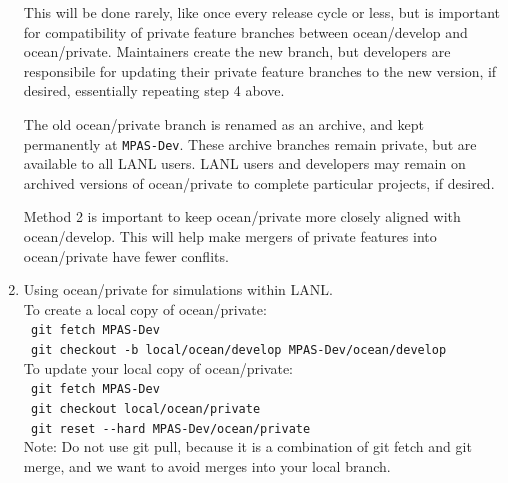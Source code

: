 \documentclass[11pt]{article}
\begin{document}
\begin{enumerate}
This will be done rarely, like once every release cycle or less, but is important for compatibility of private feature branches between ocean/develop and ocean/private.  Maintainers create the new branch, but developers are responsibile for updating their private feature branches to the new version, if desired, essentially repeating step 4 above.

The old ocean/private branch is renamed as an archive, and kept permanently at \verb|MPAS-Dev|.  These archive branches remain private, but are available to all LANL users.  LANL users and developers may remain on archived versions of ocean/private to complete particular projects, if desired.

Method 2 is important to keep ocean/private more closely aligned with ocean/develop.  This will help make mergers of private features into ocean/private have fewer conflits.

\clearpage

\item Using ocean/private for simulations within LANL. \\

To create a local copy of ocean/private:\\
\verb| git fetch MPAS-Dev| \\
\verb| git checkout -b local/ocean/develop MPAS-Dev/ocean/develop | \\

To update your local copy of ocean/private:\\
\verb| git fetch MPAS-Dev| \\
\verb| git checkout local/ocean/private| \\
\verb| git reset --hard MPAS-Dev/ocean/private | \\
Note: Do not use git pull, because it is a combination of git fetch and git merge, and we want to avoid merges into your local branch.

\end{enumerate}





\end{document}
